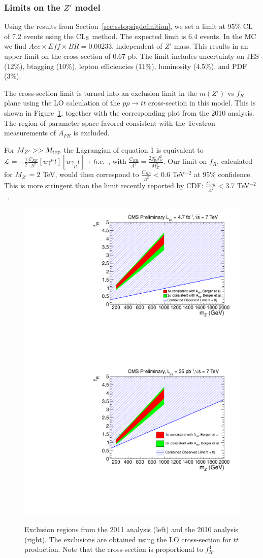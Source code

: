 \subsubsection{Limits on the $Z'$ model}
\label{sec:sstopslimits}
Using the results from Section~\ref{sec:sstopsigdefinition}, we set 
a limit at 95\% CL of 7.2 events using the CL$_{\rm S}$ method.
The expected limit is 6.4 events.
In the MC we find $Acc \times Eff \times BR = 0.00233$, independent of $Z'$ mass. 
This results in an upper limit on the cross-section of 0.67 pb.
The limit includes uncertainty
on JES (12\%), btagging (10\%), lepton efficiencies (11\%), luminosity (4.5\%),
and PDF (3\%).

The cross-section limit is turned into an exclusion limit in the $m(Z')$ vs $f_R$
plane using the LO calculation of the $pp \to tt$ cross-section in this model.
This is shown in Figure~\ref{fig:sstopexclusion}, together with the corresponding
plot from the 2010 analysis.  The region of parameter space favored consistent 
with the Tevatron measurements of $A_{FB}$ is excluded.


For $M_{Z'} >> M_{\rm top}$ the Lagrangian of equation 1 is 
equivalent to 
$\mathcal{L} = -\frac{1}{2}\frac{C_{RR}}{\Lambda^2}
 [\bar{u} \gamma^\mu t][\bar{u} \gamma_{\mu} t] + h.c.$~\cite{cdfth2},
with $\frac{C_{RR}}{\Lambda^2} = \frac{2 g_W^2 f_R^2}{M_{Z'}^2}$.
 Our limit on $f_R$, calculated for $M_{Z'}=2$ TeV, 
would then correspond to $\frac{C_{RR}}{\Lambda^2} < 0.6$ TeV$^{-2}$ at 
95\% confidence.  This is more stringent than the limit recently reported
by CDF: $\frac{C_{RR}}{\Lambda^2} < 3.7$ TeV$^{-2}$~\cite{cdflimit}.


\begin{figure}[htb]
\begin{center}
\includegraphics[width=0.45\linewidth]{figs/zprimecombined.pdf}
\includegraphics[width=0.45\linewidth]{figs/sscomb.pdf}
\caption{Exclusion regions from the 2011 analysis (left) and the 2010 analysis (right).
The exclusions are obtained using the LO cross-section for $tt$ production.  
Note that the cross-section is proportional to $f_R^4$.
\label{fig:sstopexclusion}}
\end{center}
\end{figure}

